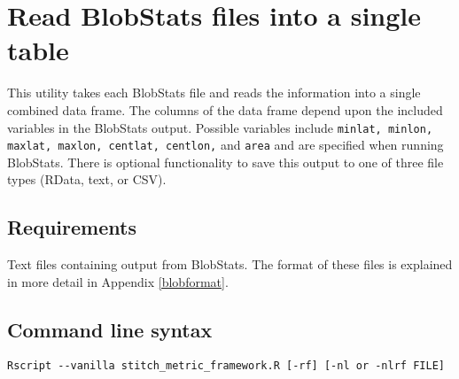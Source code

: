 \documentclass{article}
\begin{document}
%
%

\section{Read BlobStats files into a single table}\label{readfiles}
This utility takes each BlobStats file and reads the information into a single combined data frame. The columns of the data frame depend upon the included variables in the BlobStats output. Possible variables include \texttt{minlat, minlon, maxlat, maxlon, centlat, centlon,} and \texttt{area} and are specified when running BlobStats. There is optional functionality to save this output to one of three file types (RData, text, or CSV).

\subsection{Requirements}
Text files containing output from BlobStats. The format of these files is explained in more detail in Appendix \ref{blobformat}.

\subsection{Command line syntax}
\begin{verbatim}
Rscript --vanilla stitch_metric_framework.R [-rf] [-nl or -nlrf FILE]
\end{verbatim}
\end{document}

